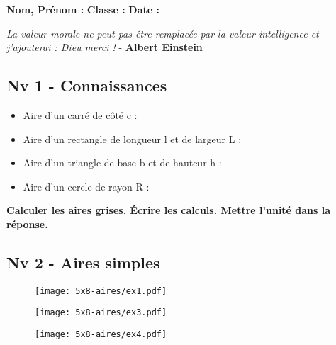 



\textbf{Nom, Prénom :} \hspace{8cm} \textbf{Classe :} \hspace{3cm} \textbf{Date :}\\

\vspace{-0.5cm} \begin{center}
  \textit{La valeur morale ne peut pas être remplacée par la valeur intelligence et j'ajouterai : Dieu merci !}  - \textbf{Albert Einstein}
\end{center}

\subsection*{Nv 1 - Connaissances}

\begin{itemize}[label={$\bullet$}]
  \item Aire d'un carré de côté c : \dotfill
  \item Aire d'un rectangle de longueur l et de largeur L : \dotfill
  \item Aire d'un triangle de base b et de hauteur h : \dotfill
  \item Aire d'un cercle de rayon R :\dotfill
\end{itemize} 

\textbf{Calculer les aires grises. Écrire les calculs. Mettre l'unité dans la réponse.}

\subsection*{Nv 2 - Aires simples}

\begin{multicols}{3}
  
\begin{figure}[H]
  \centering
  \texttt{[image: 5x8-aires/ex1.pdf]}
\end{figure}

\begin{figure}[H]
  \centering
  \texttt{[image: 5x8-aires/ex3.pdf]}
\end{figure}

\begin{figure}[H]
  \centering
  \texttt{[image: 5x8-aires/ex4.pdf]}
\end{figure}

\end{multicols}

